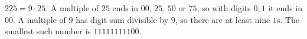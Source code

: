 $225=9\cdot25$. A multiple of $25$ ends in $00$, $25$, $50$ or $75$, so with digits $0,1$ it ends in $00$. A multiple of $9$ has digit sum divisible by $9$, so there are at least nine $1$s. The smallest such number is $\boxed{11111111100}$.
